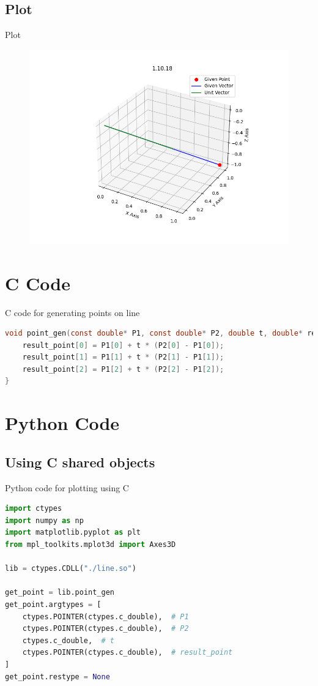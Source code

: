 \documentclass{beamer}
\theoremstyle{remark}
\numberwithin{equation}{section}
\begin{document}
\subsection{Plot}
\begin{frame}{Plot}
 \begin{figure}[H]
    \centering
    \includegraphics[width=\columnwidth]{../figs/plot.png}
    \caption*{}
    \label{fig:plot}
\end{figure}
\end{frame}
\section{C Code}
\begin{frame}[fragile]{C code for generating points on line}
\begin{lstlisting}[language=C]
void point_gen(const double* P1, const double* P2, double t, double* result_point) {
    result_point[0] = P1[0] + t * (P2[0] - P1[0]);
    result_point[1] = P1[1] + t * (P2[1] - P1[1]);
    result_point[2] = P1[2] + t * (P2[2] - P1[2]);
}
\end{lstlisting}
\end{frame}
\section{Python Code}
\subsection{Using C shared objects}
\begin{frame}[fragile]{Python code for plotting using C}
\begin{lstlisting}[language=Python]
import ctypes
import numpy as np
import matplotlib.pyplot as plt
from mpl_toolkits.mplot3d import Axes3D

lib = ctypes.CDLL("./line.so")

get_point = lib.point_gen
get_point.argtypes = [
    ctypes.POINTER(ctypes.c_double),  # P1
    ctypes.POINTER(ctypes.c_double),  # P2
    ctypes.c_double,  # t
    ctypes.POINTER(ctypes.c_double),  # result_point
]
get_point.restype = None
\end{lstlisting}
\end{frame}
\end{document}
